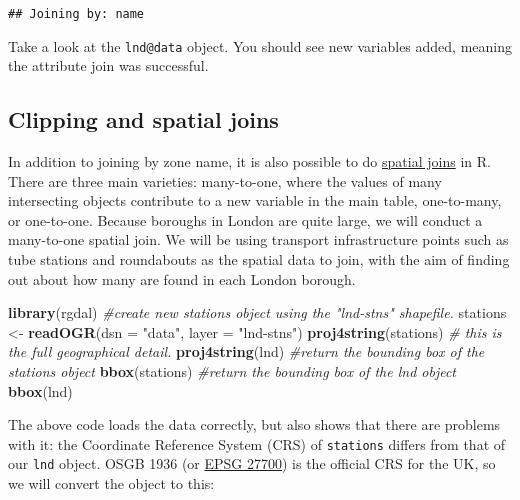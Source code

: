 \documentclass[]{article}
\newenvironment{Shaded}{}{}
\newcommand{\KeywordTok}[1]{\textcolor[rgb]{0.00,0.44,0.13}{\textbf{{#1}}}}
\newcommand{\DataTypeTok}[1]{\textcolor[rgb]{0.56,0.13,0.00}{{#1}}}
\newcommand{\StringTok}[1]{\textcolor[rgb]{0.25,0.44,0.63}{{#1}}}
\newcommand{\CommentTok}[1]{\textcolor[rgb]{0.38,0.63,0.69}{\textit{{#1}}}}
\newcommand{\NormalTok}[1]{{#1}}
\begin{document}
\begin{verbatim}
## Joining by: name
\end{verbatim}

Take a look at the \texttt{lnd@data} object. You should see new
variables added, meaning the attribute join was successful.

\subsection{Clipping and spatial
joins}\label{clipping-and-spatial-joins}

In addition to joining by zone name, it is also possible to do
\href{http://help.arcgis.com/en/arcgisdesktop/10.0/help/index.html\#//00080000000q000000}{spatial
joins} in R. There are three main varieties: many-to-one, where the
values of many intersecting objects contribute to a new variable in the
main table, one-to-many, or one-to-one. Because boroughs in London are
quite large, we will conduct a many-to-one spatial join. We will be
using transport infrastructure points such as tube stations and
roundabouts as the spatial data to join, with the aim of finding out
about how many are found in each London borough.

\begin{Shaded}
\begin{Highlighting}[]
\KeywordTok{library}\NormalTok{(rgdal)}
\CommentTok{#create new stations object using the "lnd-stns" shapefile.}
\NormalTok{stations <-}\StringTok{ }\KeywordTok{readOGR}\NormalTok{(}\DataTypeTok{dsn =} \StringTok{"data"}\NormalTok{, }\DataTypeTok{layer =} \StringTok{"lnd-stns"}\NormalTok{)}
\KeywordTok{proj4string}\NormalTok{(stations) }\CommentTok{# this is the full geographical detail.}
\KeywordTok{proj4string}\NormalTok{(lnd)}
\CommentTok{#return the bounding box of the stations object}
\KeywordTok{bbox}\NormalTok{(stations)}
\CommentTok{#return the bounding box of the lnd object}
\KeywordTok{bbox}\NormalTok{(lnd)}
\end{Highlighting}
\end{Shaded}

The above code loads the data correctly, but also shows that there are
problems with it: the Coordinate Reference System (CRS) of
\texttt{stations} differs from that of our \texttt{lnd} object. OSGB
1936 (or \href{http://spatialreference.org/ref/epsg/27700/}{EPSG 27700})
is the official CRS for the UK, so we will convert the object to this:
\end{document}

